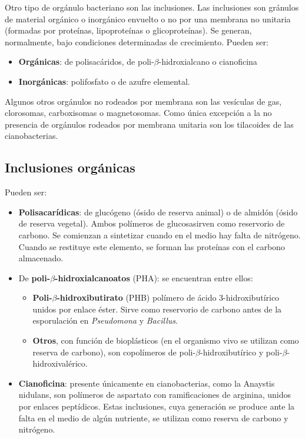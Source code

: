 Otro tipo de orgánulo bacteriano son las inclusiones. Las inclusiones son gránulos de material orgánico o inorgánico envuelto o no por una membrana no unitaria (formadas por proteínas, lipoproteínas o glicoproteínas). Se generan, normalmente, bajo condiciones determinadas de crecimiento. Pueden ser:
\begin{itemize}[itemsep=0pt,parsep=0pt,topsep=0pt,partopsep=0pt]
	\item \textbf{Orgánicas}: de polisacáridos, de poli-$\beta$-hidroxialcano o cianoficina
	\item \textbf{Inorgánicas}: polifosfato o de azufre elemental. 
\end{itemize}

Algunos otros orgánulos no rodeados por membrana son las vesículas de gas, clorosomas, carboxisomas o magnetosomas. Como única excepción a la no presencia de orgánulos rodeados por membrana unitaria son los tilacoides de las cianobacterias.
\subsection{Inclusiones orgánicas}
Pueden ser:
\begin{itemize}[itemsep=0pt,parsep=0pt,topsep=0pt,partopsep=0pt]
	\item \textbf{Polisacarídicas}: de glucógeno (ósido de reserva animal) o de almidón (ósido de reserva vegetal). Ambos polímeros de glucosasirven como reservorio de carbono. Se comienzan a sintetizar cuando en el medio hay falta de nitrógeno. Cuando se restituye este elemento, se forman las proteínas con el carbono almacenado.
	\item De \textbf{poli-$\beta$-hidroxialcanoatos} (PHA): se encuentran entre ellos:
	\begin{itemize}[itemsep=0pt,parsep=0pt,topsep=0pt,partopsep=0pt]
		\item \textbf{Poli-$\beta$-hidroxibutirato} (PHB) polímero de ácido 3-hidroxibutírico unidos por enlace éster. Sirve como reservorio de carbono antes de la esporulación en \textit{Pseudomona} y \textit{Bacillus}.
		\item \textbf{Otros}, con función de bioplásticos (en el organismo vivo se utilizan como reserva de carbono), son copolímeros de poli-$\beta$-hidroxibutírico y poli-$\beta$-hidroxivalérico.
	\end{itemize}
	\item \textbf{Cianoficina}: presente únicamente en cianobacterias, como la Anaystis nidulans, son polímeros de aspartato con ramificaciones de arginina, unidos por enlaces peptídicos. Estas inclusiones, cuya generación se produce ante la falta en el medio de algún nutriente, se utilizan como reserva de carbono y nitrógeno.
\end{itemize}
